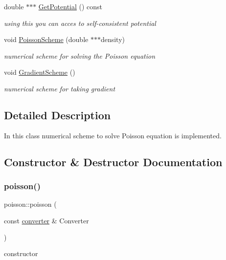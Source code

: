 \begin{DoxyCompactItemize}
double $\ast$$\ast$$\ast$ \mbox{\hyperlink{classpoisson_a63c221d801cfda8164b7ec6ebdbadbbb}{Get\+Potential}} () const
\begin{DoxyCompactList}\small\item\em using this you can acces to self-\/consistent potential \end{DoxyCompactList}\item 
void \mbox{\hyperlink{classpoisson_ae1e3d81634d4af806778d49e113f2405}{Poisson\+Scheme}} (double $\ast$$\ast$$\ast$density)
\begin{DoxyCompactList}\small\item\em numerical scheme for solving the Poisson equation \end{DoxyCompactList}\item 
void \mbox{\hyperlink{classpoisson_ab99b96968796501b381426609037c6b8}{Gradient\+Scheme}} ()
\begin{DoxyCompactList}\small\item\em numerical scheme for taking gradient \end{DoxyCompactList}\end{DoxyCompactItemize}


\subsection{Detailed Description}
In this class numerical scheme to solve Poisson equation is implemented. 

\subsection{Constructor \& Destructor Documentation}
\mbox{\label{classpoisson_a747dc597f8b38040bde8e40fc47054b4}} 
\subsubsection{\texorpdfstring{poisson()}{poisson()}}
{\footnotesize\ttfamily poisson\+::poisson (\begin{DoxyParamCaption}\item[{const \mbox{\hyperlink{classconverter}{converter}} \&}]{Converter }\end{DoxyParamCaption})}



constructor 

\mbox{\label{classpoisson_abcc4fdb354830a10fb4e2e42a5fad718}} 
